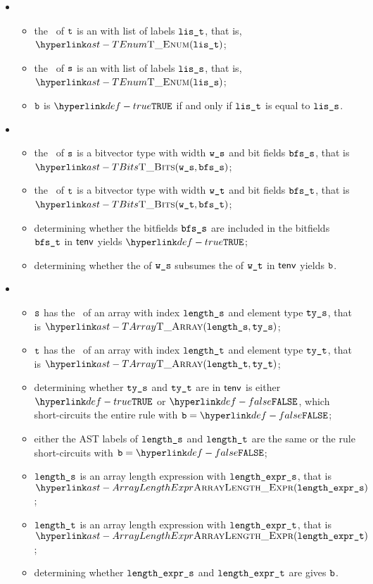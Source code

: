 \begin{itemize}
\item {}
  \begin{itemize}
  \item the \underlyingtype\ of $\texttt{t}$ is an \enumerationtypeterm{} with list of labels $\texttt{lis\_t}$, that is, $\TEnum(\vlit)$;
  \item the \underlyingtype\ of $\texttt{s}$ is an \enumerationtypeterm{} with list of labels $\texttt{lis\_s}$, that is, $\TEnum(\vlis)$;
  \item $\texttt{b}$ is $\True$ if and only if $\texttt{lis\_t}$ is equal to $\texttt{lis\_s}$.
  \end{itemize}

\item {}
  \begin{itemize}
  \item the \underlyingtype\ of $\texttt{s}$ is a bitvector type with width $\texttt{w\_s}$ and bit fields $\texttt{bfs\_s}$, that is $\TBits(\ws, \bfss)$;
  \item the \underlyingtype\ of $\texttt{t}$ is a bitvector type with width $\texttt{w\_t}$ and bit fields $\texttt{bfs\_t}$, that is $\TBits(\wt, \bfst)$;
  \item determining whether the bitfields $\texttt{bfs\_s}$ are included in the bitfields $\texttt{bfs\_t}$ in $\textsf{tenv}$ yields $\True$\ProseOrTypeError;
  \item determining whether the \symbolicdomainterm{} of $\texttt{w\_s}$ subsumes the \symbolicdomainterm{} of $\texttt{w\_t}$ in $\textsf{tenv}$ yields $\texttt{b}$.
  \end{itemize}

\item {}
  \begin{itemize}
  \item $\texttt{s}$ has the \underlyingtype\ of an array with index $\texttt{length\_s}$ and element type $\texttt{ty\_s}$, that is $\TArray(\vlengths, \vtys)$;
  \item $\texttt{t}$ has the \underlyingtype\ of an array with index $\texttt{length\_t}$ and element type $\texttt{ty\_t}$, that is $\TArray(\vlengtht, \vtyt)$;
  \item determining whether $\texttt{ty\_s}$ and $\texttt{ty\_t}$ are \equivalenttypesterm{} in $\textsf{tenv}$ is either $\True$
  or $\False$, which short-circuits the entire rule with $\vb=\False$;
  \item either the AST labels of $\texttt{length\_s}$ and $\texttt{length\_t}$ are the same or the rule short-circuits with $\vb=\False$;
  \item $\texttt{length\_s}$ is an array length expression with $\texttt{length\_expr\_s}$, that is \\ $\ArrayLengthExpr(\vlengthexprs)$;
  \item $\texttt{length\_t}$ is an array length expression with $\texttt{length\_expr\_t}$, that is \\ $\ArrayLengthExpr(\vlengthexprt)$;
  \item determining whether $\texttt{length\_expr\_s}$ and $\texttt{length\_expr\_t}$ are \equivalentexprsterm{} gives $\texttt{b}$.
  \end{itemize}


\end{itemize}
